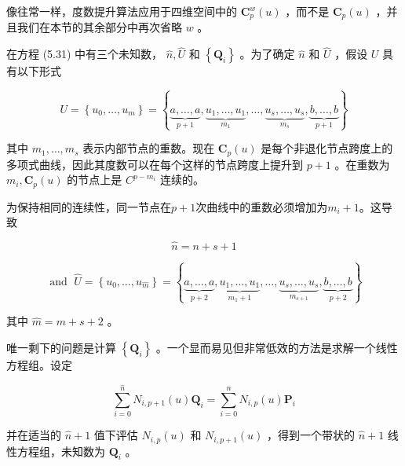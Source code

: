 \documentclass[../main.tex]{subfiles}
\begin{document}
像往常一样，度数提升算法应用于四维空间中的 \({\mathbf{C}}_{p}^{w}\left( u\right)\) ，而不是 \({\mathbf{C}}_{p}\left( u\right)\) ，并且我们在本节的其余部分中再次省略 \(w\) 。

在方程 (5.31) 中有三个未知数， \(\widehat{n},\widehat{U}\) 和 \(\left\{  {\mathbf{Q}}_{i}\right\}\) 。为了确定 \(\widehat{n}\) 和 \(\widehat{U}\) ，假设 \(U\) 具有以下形式

\[
U = \left\{  {{u}_{0},\ldots ,{u}_{m}}\right\}   = \left\{  {\underset{p + 1}{\underbrace{a,\ldots ,a}},\underset{{m}_{1}}{\underbrace{{u}_{1},\ldots ,{u}_{1}}},\ldots ,\underset{{m}_{s}}{\underbrace{{u}_{s},\ldots ,{u}_{s}}},\underset{p + 1}{\underbrace{b,\ldots ,b}}}\right\}
\]

其中 \({m}_{1},\ldots ,{m}_{s}\) 表示内部节点的重数。现在 \({\mathbf{C}}_{p}\left( u\right)\) 是每个非退化节点跨度上的多项式曲线，因此其度数可以在每个这样的节点跨度上提升到 \(p + 1\) 。在重数为 \({m}_{i},{\mathbf{C}}_{p}\left( u\right)\) 的节点上是 \({C}^{p - {m}_{i}}\) 连续的。



为保持相同的连续性，同一节点在\(p+1\)次曲线中的重数必须增加为\(m_i+1\)。这导致

\[
\widehat{n} = n + s + 1 \tag{5.32}
\]

\[
\text{ and }\;\widehat{U} = \left\{  {{u}_{0},\ldots ,{u}_{\widehat{m}}}\right\}   = \left\{  {\underset{p + 2}{\underbrace{a,\ldots ,a}},\underset{{m}_{1} + 1}{\underbrace{{u}_{1},\ldots ,{u}_{1}}},\ldots ,\underset{{m}_{s + 1}}{\underbrace{{u}_{s},\ldots ,{u}_{s}}},\underset{p + 2}{\underbrace{b,\ldots ,b}}}\right\}   \tag{5.33}
\]

其中 \(\widehat{m} = m + s + 2\) 。

















唯一剩下的问题是计算 \(\left\{  {\mathbf{Q}}_{i}\right\}\) 。一个显而易见但非常低效的方法是求解一个线性方程组。设定

\[
\mathop{\sum }\limits_{{i = 0}}^{\widehat{n}}{N}_{i,p + 1}\left( u\right) {\mathbf{Q}}_{i} = \mathop{\sum }\limits_{{i = 0}}^{n}{N}_{i,p}\left( u\right) {\mathbf{P}}_{i}
\]

并在适当的 \(\widehat{n} + 1\) 值下评估 \({N}_{i,p}\left( u\right)\) 和 \({N}_{i,p + 1}\left( u\right)\) ，得到一个带状的 \(\widehat{n} + 1\) 线性方程组，未知数为 \({\mathbf{Q}}_{i}\) 。
\end{document}
